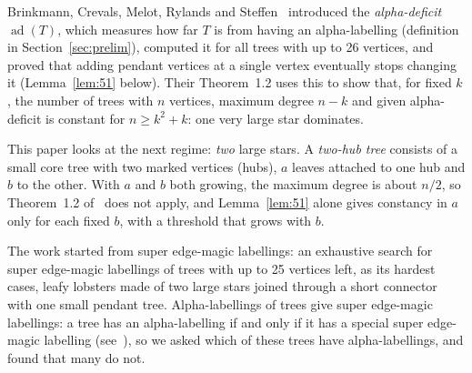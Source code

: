 \documentclass[11pt]{amsart}
\theoremstyle{definition}
\newcommand{\ad}{\operatorname{ad}}
\begin{document}
Brinkmann, Crevals, Melot, Rylands and Steffen~\cite{bcmrs} introduced the \emph{alpha-deficit} $\ad(T)$, which
measures how far $T$ is from having an alpha-labelling (definition in Section~\ref{sec:prelim}), computed it for all
trees with up to 26 vertices, and proved that adding pendant vertices at a single vertex eventually stops changing
it (Lemma~\ref{lem:51} below). Their Theorem~1.2 uses this to show that, for fixed $k$, the number of trees with
$n$ vertices, maximum degree $n-k$ and given alpha-deficit is constant for $n\ge k^2+k$: one very large star
dominates.

This paper looks at the next regime: \emph{two} large stars. A \emph{two-hub tree} consists of a small core tree
with two marked vertices (hubs), $a$ leaves attached to one hub and $b$ to the other. With $a$ and $b$ both
growing, the maximum degree is about $n/2$, so Theorem~1.2 of~\cite{bcmrs} does not apply, and Lemma~\ref{lem:51}
alone gives constancy in $a$ only for each fixed $b$, with a threshold that grows with $b$.

The work started from super edge-magic labellings: an exhaustive search for super edge-magic labellings of trees
with up to 25 vertices left, as its hardest cases, leafy lobsters made of two large stars joined through a short
connector with one small pendant tree. Alpha-labellings of trees give super edge-magic labellings: a tree has an
alpha-labelling if and only if it has a special super edge-magic labelling (see~\cite{muntaner}), so we asked which of these trees have
alpha-labellings, and found that many do not.
\end{document}
